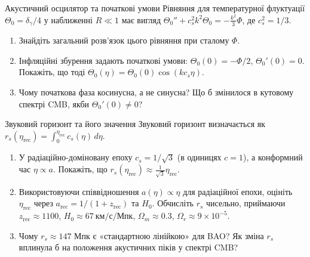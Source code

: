 
\begin{problem}{Акустичний осцилятор та початкові умови}
Рівняння для температурної флуктуації $\Theta_0 = \delta_\gamma/4$ у наближенні
$R \ll 1$ має вигляд $\Theta_0'' + c_s^2 k^2 \Theta_0 = -\frac{k^2}{3}\Phi$,
де $c_s^2 = 1/3$.

\begin{enumerate}
    \item Знайдіть загальний розв'язок цього рівняння при сталому $\Phi$.
    \item Інфляційні збурення задають початкові умови: $\Theta_0(0) = -\Phi/2$,
          $\Theta_0'(0) = 0$. Покажіть, що тоді $\Theta_0(\eta) = \Theta_0(0)\cos(k c_s \eta)$.
    \item Чому початкова фаза косинусна, а не синусна? Що б змінилося в кутовому
          спектрі CMB, якби $\Theta_0'(0) \neq 0$?
\end{enumerate}
\end{problem}


\begin{problem}{Звуковий горизонт та його значення}
Звуковий горизонт визначається як $r_s(\eta_{\text{rec}}) = \int_0^{\eta_{\text{rec}}} c_s(\eta)\,d\eta$.

\begin{enumerate}
    \item У радіаційно-доміновану епоху $c_s = 1/\sqrt{3}$ (в одиницях $c=1$),
          а конформний час $\eta \propto a$. Покажіть, що $r_s(\eta_{\text{rec}}) \approx \frac{1}{\sqrt{3}}\eta_{\text{rec}}$.
    \item Використовуючи співвідношення $a(\eta) \propto \eta$ для радіаційної епохи,
          оцініть $\eta_{\text{rec}}$ через $a_{\text{rec}} = 1/(1+z_{\text{rec}})$ та
          $H_0$. Обчисліть $r_s$ чисельно, приймаючи $z_{\text{rec}} \approx 1100$,
          $H_0 \approx 67\ \text{км/с/Мпк}$, $\Omega_m \approx 0.3$, $\Omega_r \approx 9\times10^{-5}$.
   \item Чому $r_s \approx 147$ Мпк є «стандартною лінійкою» для BAO?
          Як зміна $r_s$ вплинула б на положення акустичних піків у спектрі CMB?
\end{enumerate}
\end{problem}


